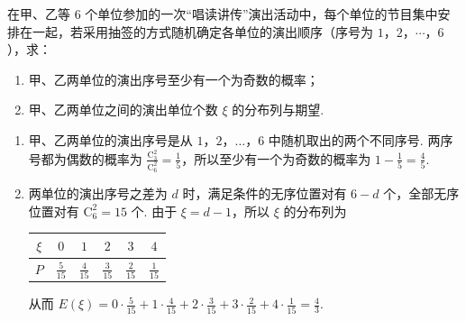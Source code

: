 \begin{problem}
在甲、乙等 6 个单位参加的一次“唱读讲传”演出活动中，每个单位的节目集中安排在一起，若采用抽签的方式随机确定各单位的演出顺序（序号为 \(1\)，\(2\)，\(\cdots\)，\(6\)），求：

\begin{enumerate}
\item 甲、乙两单位的演出序号至少有一个为奇数的概率；
\item 甲、乙两单位之间的演出单位个数 \(\xi\) 的分布列与期望.
\end{enumerate}

\begin{solution}
\begin{enumerate}
\item 甲、乙两单位的演出序号是从 \(1\)，\(2\)，\(\ldots\)，\(6\) 中随机取出的两个不同序号. 两序号都为偶数的概率为 \(\frac{\mathrm C_3^2}{\mathrm C_6^2}=\frac{1}{5}\)，所以至少有一个为奇数的概率为 \(1-\frac{1}{5}=\frac{4}{5}\).
\item 两单位的演出序号之差为 \(d\) 时，满足条件的无序位置对有 \(6-d\) 个，全部无序位置对有 \(\mathrm C_6^2=15\) 个. 由于 \(\xi=d-1\)，所以 \(\xi\) 的分布列为
\begin{center}
\begin{tabular}{c|ccccc}
\(\xi\) & \(0\) & \(1\) & \(2\) & \(3\) & \(4\) \\
\hline
\(P\) & \(\frac{5}{15}\) & \(\frac{4}{15}\) & \(\frac{3}{15}\) & \(\frac{2}{15}\) & \(\frac{1}{15}\)
\end{tabular}
\end{center}
从而 \(E(\xi)=0\cdot\frac{5}{15}+1\cdot\frac{4}{15}+2\cdot\frac{3}{15}+3\cdot\frac{2}{15}+4\cdot\frac{1}{15}=\frac{4}{3}\).
\end{enumerate}
\end{solution}
\end{problem}

